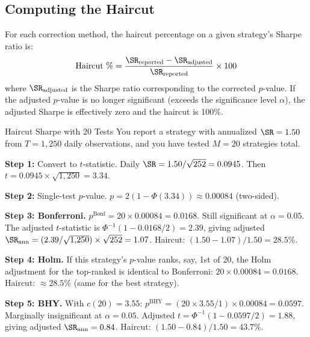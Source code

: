\subsection{Computing the Haircut}

For each correction method, the haircut percentage on a given strategy's Sharpe ratio is:
\begin{equation}
\text{Haircut \%} = \frac{\SR_{\text{reported}} - \SR_{\text{adjusted}}}{\SR_{\text{reported}}} \times 100
\label{eq:haircut-pct}
\end{equation}
where $\SR_{\text{adjusted}}$ is the Sharpe ratio corresponding to the corrected $p$-value. If the adjusted $p$-value is no longer significant (exceeds the significance level $\alpha$), the adjusted Sharpe is effectively zero and the haircut is 100\%.

\begin{workedexample}{Haircut Sharpe with 20 Tests}
You report a strategy with annualized $\SR = 1.50$ from $T = 1{,}250$ daily observations, and you have tested $M = 20$ strategies total.

\textbf{Step 1:} Convert to $t$-statistic. Daily $\SR = 1.50/\sqrt{252} = 0.0945$. Then $t = 0.0945 \times \sqrt{1{,}250} = 3.34$.

\textbf{Step 2:} Single-test $p$-value. $p = 2(1 - \Phi(3.34)) \approx 0.00084$ (two-sided).

\textbf{Step 3: Bonferroni.} $p^{\text{Bonf}} = 20 \times 0.00084 = 0.0168$. Still significant at $\alpha = 0.05$. The adjusted $t$-statistic is $\Phi^{-1}(1 - 0.0168/2) = 2.39$, giving adjusted $\SR_{\text{ann}} = (2.39/\sqrt{1{,}250}) \times \sqrt{252} = 1.07$. Haircut: $(1.50 - 1.07)/1.50 = 28.5\%$.

\textbf{Step 4: Holm.} If this strategy's $p$-value ranks, say, 1st of 20, the Holm adjustment for the top-ranked is identical to Bonferroni: $20 \times 0.00084 = 0.0168$. Haircut: $\approx 28.5\%$ (same for the best strategy).

\textbf{Step 5: BHY.} With $c(20) = 3.55$: $p^{\text{BHY}} = (20 \times 3.55 / 1) \times 0.00084 = 0.0597$. Marginally insignificant at $\alpha = 0.05$. Adjusted $t = \Phi^{-1}(1 - 0.0597/2) = 1.88$, giving adjusted $\SR_{\text{ann}} = 0.84$. Haircut: $(1.50 - 0.84)/1.50 = 43.7\%$.


\end{workedexample}
